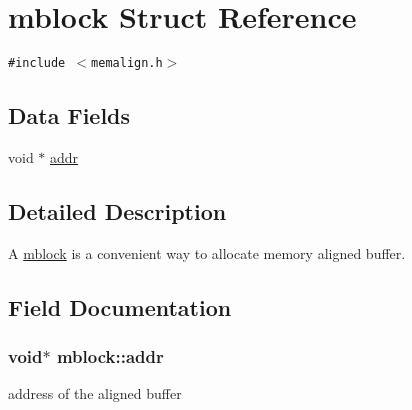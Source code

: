 \hypertarget{structmblock}{
\section{mblock Struct Reference}
\label{structmblock}
}
{\tt \#include $<$memalign.h$>$}

\subsection*{Data Fields}
\begin{CompactItemize}
\item 
void $\ast$ \hyperlink{structmblock_b3a1756a7c6a5ede7265b6f025ae1dc5}{addr}
\end{CompactItemize}


\subsection{Detailed Description}
A \hyperlink{structmblock}{mblock} is a convenient way to allocate memory aligned buffer. 

\subsection{Field Documentation}
\hypertarget{structmblock_b3a1756a7c6a5ede7265b6f025ae1dc5}{
\subsubsection{\setlength{\rightskip}{0pt plus 5cm}void$\ast$ {\bf mblock::addr}}}
\label{structmblock_b3a1756a7c6a5ede7265b6f025ae1dc5}


address of the aligned buffer 